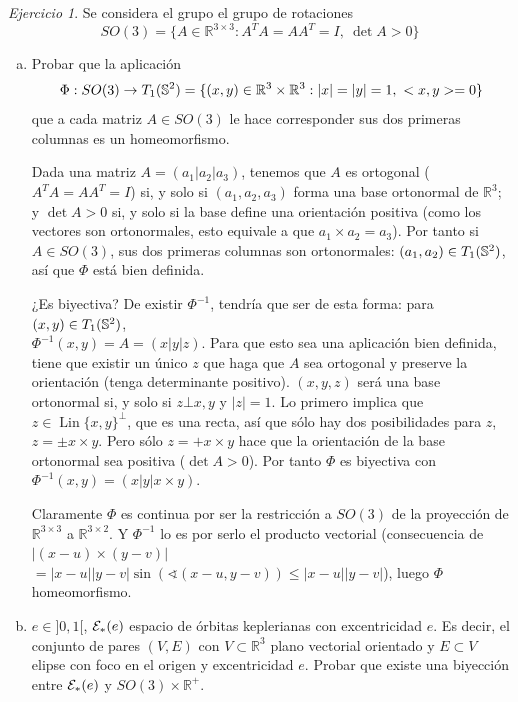 \documentclass[12pt,spanish]{article}
\theoremstyle{definition}
\theoremstyle{remark}
\newtheorem{exercise}{Ejercicio}
\newcommand{\R}{\mathbb{R}}
\begin{document}
\newpage
\begin{exercise}

  Se considera el grupo el grupo de rotaciones
  \[SO(3)=\{A\in\R^{3\times 3}:A^T A=AA^T=I,\ \det A>0\}\]

  \begin{enumerate}[a)]
  \item Probar que la aplicación
    \[\Phi:SO(3)\rightarrow \T=\{(x,y)\in\R^3\times\R^3:|x|=|y|=1,\
      <x,y>=0\}\] que a cada matriz $A\in SO(3)$ le hace corresponder
    sus dos primeras columnas es un homeomorfismo.

    Dada una matriz $A=(a_1|a_2|a_3)$, tenemos que $A$ es ortogonal
    ($A^T A=AA^T=I$) si, y solo si $(a_1,a_2,a_3)$ forma una base
    ortonormal de $\R^3$; y $\det A>0$ si, y solo si la base define
    una orientación positiva (como los vectores son ortonormales, esto
    equivale a que $a_1\times a_2=a_3$). Por tanto si $A\in SO(3)$,
    sus dos primeras columnas son ortonormales: $(a_1,a_2)\in T_1(\mathbb{S}^2)$, así
    que $\Phi$ está bien definida.

    ¿Es biyectiva? De existir $\Phi^{-1}$, tendría que ser de esta
    forma: para $(x,y)\in T_1(\mathbb{S}^2)$, \\ $\Phi^{-1}(x,y)=A=(x|y|z)$. Para que
    esto sea una aplicación bien definida, tiene que existir un único
    $z$ que haga que $A$ sea ortogonal y preserve la orientación
    (tenga determinante positivo). $(x,y,z)$ será una base ortonormal
    si, y solo si $z\bot x,y$ y $|z|=1$. Lo primero implica que
    $z\in \operatorname{Lin}\{x,y\}^\bot$, que es una recta, así que
    sólo hay dos posibilidades para $z$, $z=\pm x\times y$. Pero sólo
    $z=+x\times y$ hace que la orientación de la base ortonormal
    sea positiva ($\det A>0$). Por tanto $\Phi$ es biyectiva con \\
    $\Phi^{-1}(x,y)=(x|y|x\times y)$.

    Claramente $\Phi$ es continua por ser la restricción a $SO(3)$ de
    la proyección de $\R^{3\times 3}$ a $\R^{3\times 2}$. Y
    $\Phi^{-1}$ lo es por serlo el producto vectorial (consecuencia de
    $|(x-u)\times (y-v)|$\\
    $=|x-u||y-v|\sin(\sphericalangle(x-u,y-v))\leq |x-u||y-v|$), luego
    $\Phi$ homeomorfismo.

  \item $e\in]0,1[$, $\mathcal{E}_*(e)$ espacio de órbitas keplerianas con
    excentricidad $e$. Es decir, el conjunto de pares $(V,E)$ con
    $V\subset\R^3$ plano vectorial orientado y $E\subset V$ elipse con
    foco en el origen y excentricidad $e$. Probar que existe una
    biyección entre $\mathcal{E}_*(e)$ y $SO(3)\times\R^+$.


\end{enumerate}
\end{exercise}
\end{document}
